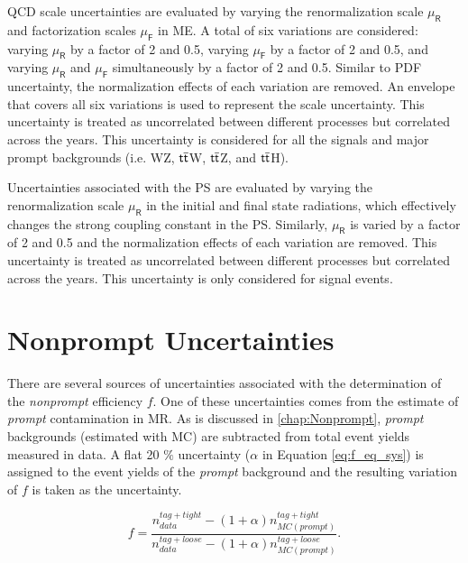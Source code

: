 \ac{QCD} scale uncertainties are evaluated by varying the renormalization scale $\mu_\textsf{R}$ and factorization scales $\mu_\textsf{F}$ in \ac{ME}. A total of six variations are considered: varying $\mu_\textsf{R}$ by a factor of 2 and 0.5, varying $\mu_\textsf{F}$ by a factor of 2 and 0.5, and varying $\mu_\textsf{R}$ and $\mu_\textsf{F}$ simultaneously by a factor of 2 and 0.5. Similar to \ac{PDF} uncertainty, the normalization effects of each variation are removed. An envelope that covers all six variations is used to represent the scale uncertainty. This uncertainty is treated as uncorrelated between different processes but correlated across the years. This uncertainty is considered for all the signals and major prompt backgrounds (i.e. WZ, $\textsf{t}\overline{\textsf{t}}$W, $\textsf{t}\overline{\textsf{t}}$Z, and $\textsf{t}\overline{\textsf{t}}$H).

Uncertainties associated with the \ac{PS} are evaluated by varying the renormalization scale $\mu_\textsf{R}$ in the initial and final state radiations, which effectively changes the strong coupling constant in the \ac{PS}. Similarly, $\mu_\textsf{R}$ is varied by a factor of 2 and 0.5 and the normalization effects of each variation are removed. This uncertainty is treated as uncorrelated between different processes but correlated across the years. This uncertainty is only considered for signal events.

\section{Nonprompt Uncertainties}
\label{sec:NonUnc}

There are several sources of uncertainties associated with the determination of the \emph{nonprompt} efficiency $f$. One of these uncertainties comes from the estimate of \emph{prompt} contamination in \ac{MR}. As is discussed in \autoref{chap:Nonprompt}, \emph{prompt} backgrounds (estimated with \ac{MC}) are subtracted from total event yields measured in data. A flat 20 $\%$ uncertainty ($\alpha$ in Equation \ref{eq:f_eq_sys}) is assigned to the event yields of the \emph{prompt} background and the resulting variation of $f$ is taken as the uncertainty.

\begin{equation}
f=\frac{n_{data}^{tag+tight}-(1+\alpha)n_{MC(prompt)}^{tag+tight}}{n_{data}^{tag+loose}-(1+\alpha)n_{MC(prompt)}^{tag+loose}}.
\label{eq:f_eq_sys}
\end{equation}  

